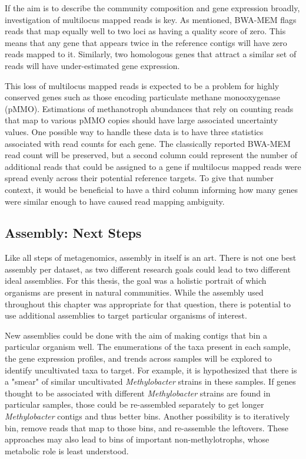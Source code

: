 If the aim is to describe the community composition and gene expression broadly, investigation of multilocus mapped reads is key.
As mentioned, BWA-MEM flags reads that map equally well to two loci as having a quality score of zero.
This means that any gene that appears twice in the reference contigs will have zero reads mapped to it.
Similarly, two homologous genes that attract a similar set of reads will have under-estimated gene expression.

This loss of multilocus mapped reads is expected to be a problem for highly conserved genes such as those encoding particulate methane monooxygenase (pMMO).
Estimations of methanotroph abundances that rely on counting reads that map to various pMMO copies should have large associated uncertainty values.
One possible way to handle these data is to have three statistics associated with read counts for each gene.
The classically reported BWA-MEM read count will be preserved, but a second column could represent the number of additional reads that could be assigned to a gene if multilocus mapped reads were spread evenly across their potential reference targets.
To give that number context, it would be beneficial to have a third column informing how many genes were similar enough to have caused read mapping ambiguity.

\subsection{Assembly: Next Steps}
\label{sect:assembly_discussion}

Like all steps of metagenomics, assembly in itself is an art.
There is not one best assembly per dataset, as two different research goals could lead to two different ideal assemblies.
For this thesis, the goal was a holistic portrait of which organisms are present in natural communities.
While the assembly used throughout this chapter was appropriate for that question, there is potential to use additional assemblies to target particular organisms of interest.

New assemblies could be done with the aim of making contigs that bin a particular organism well.
The enumerations of the taxa present in each sample, the gene expression profiles, and trends across samples will be explored to identify uncultivated taxa to target.
For example, it is hypothesized that there is a "smear" of similar uncultivated \textit{Methylobacter} strains in these samples.
If genes thought to be associated with different \textit{Methylobacter} strains are found in particular samples, those could be re-assembled separately to get longer \textit{Methylobacter} contigs and thus better bins.
Another possibility is to iteratively bin, remove reads that map to those bins, and re-assemble the leftovers.
These approaches may also lead to bins of important non-methylotrophs, whose metabolic role is least understood.

